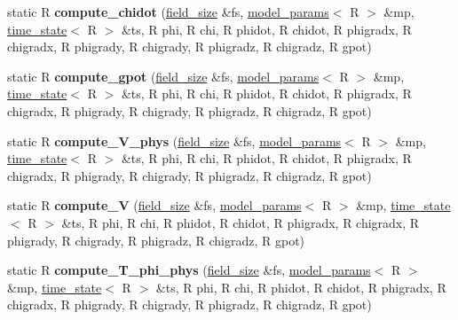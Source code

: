 \begin{DoxyCompactItemize}
\item 
\hypertarget{structgrid__funcs_a4ec089bdc58e7567490f76ac9c573874}{
static R {\bfseries compute\_\-chidot} (\hyperlink{structfield__size}{field\_\-size} \&fs, \hyperlink{structmodel__params}{model\_\-params}$<$ R $>$ \&mp, \hyperlink{structtime__state}{time\_\-state}$<$ R $>$ \&ts, R phi, R chi, R phidot, R chidot, R phigradx, R chigradx, R phigrady, R chigrady, R phigradz, R chigradz, R gpot)}
\label{structgrid__funcs_a4ec089bdc58e7567490f76ac9c573874}

\item 
\hypertarget{structgrid__funcs_acd4a897e35c94b0d9117e17657183f24}{
static R {\bfseries compute\_\-gpot} (\hyperlink{structfield__size}{field\_\-size} \&fs, \hyperlink{structmodel__params}{model\_\-params}$<$ R $>$ \&mp, \hyperlink{structtime__state}{time\_\-state}$<$ R $>$ \&ts, R phi, R chi, R phidot, R chidot, R phigradx, R chigradx, R phigrady, R chigrady, R phigradz, R chigradz, R gpot)}
\label{structgrid__funcs_acd4a897e35c94b0d9117e17657183f24}

\item 
\hypertarget{structgrid__funcs_a7885ccd2de4b13fa5f62e2a54bc024c3}{
static R {\bfseries compute\_\-V\_\-phys} (\hyperlink{structfield__size}{field\_\-size} \&fs, \hyperlink{structmodel__params}{model\_\-params}$<$ R $>$ \&mp, \hyperlink{structtime__state}{time\_\-state}$<$ R $>$ \&ts, R phi, R chi, R phidot, R chidot, R phigradx, R chigradx, R phigrady, R chigrady, R phigradz, R chigradz, R gpot)}
\label{structgrid__funcs_a7885ccd2de4b13fa5f62e2a54bc024c3}

\item 
\hypertarget{structgrid__funcs_ab66e81d76717db7a9ea1253563831fde}{
static R {\bfseries compute\_\-V} (\hyperlink{structfield__size}{field\_\-size} \&fs, \hyperlink{structmodel__params}{model\_\-params}$<$ R $>$ \&mp, \hyperlink{structtime__state}{time\_\-state}$<$ R $>$ \&ts, R phi, R chi, R phidot, R chidot, R phigradx, R chigradx, R phigrady, R chigrady, R phigradz, R chigradz, R gpot)}
\label{structgrid__funcs_ab66e81d76717db7a9ea1253563831fde}

\item 
\hypertarget{structgrid__funcs_af073a8df257142a29b92fac7fb0ec993}{
static R {\bfseries compute\_\-T\_\-phi\_\-phys} (\hyperlink{structfield__size}{field\_\-size} \&fs, \hyperlink{structmodel__params}{model\_\-params}$<$ R $>$ \&mp, \hyperlink{structtime__state}{time\_\-state}$<$ R $>$ \&ts, R phi, R chi, R phidot, R chidot, R phigradx, R chigradx, R phigrady, R chigrady, R phigradz, R chigradz, R gpot)}
\label{structgrid__funcs_af073a8df257142a29b92fac7fb0ec993}


\end{DoxyCompactItemize}
